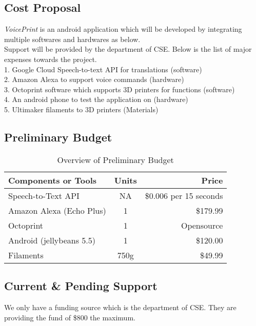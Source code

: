 \subsection{Cost Proposal}
\textit{VoicePrint} is an android application which will be developed by integrating multiple softwares and hardwares as below.
\\
Support will be provided by the department of CSE. Below is the list of major expenses towards the project.
\\
1. Google Cloud Speech-to-text API for translations (software)
\\
2. Amazon Alexa to support voice commands (hardware)
\\
3. Octoprint software which supports 3D printers for functions (software)
\\
4. An android phone to test the application on (hardware)
\\
5. Ultimaker filaments to 3D printers (Materials) \\

\subsection{Preliminary Budget}
\begin{table}
    \centering
    \begin{tabular}{|l|c|r|}
    	\hline
        \textbf{Components or Tools} & \textbf{Units} & \textbf{Price} \\
        \hline
	    Speech-to-Text API & NA & \$0.006 per 15 seconds\\
	    \hline
	    Amazon Alexa (Echo Plus) & 1 & \$179.99\\
	    \hline
    	Octoprint & 1 & Opensource\\
    	\hline
	    Android (jellybeans 5.5) & 1 & \$120.00\\
	    \hline
	    Filaments & 750g & \$49.99\\
	    \hline
    \end{tabular}
    \caption{Overview of Preliminary Budget}
\end{table}

\subsection{Current \& Pending Support}
We only have a funding source which is the department of CSE. They are providing the fund of \$800 the maximum. \\